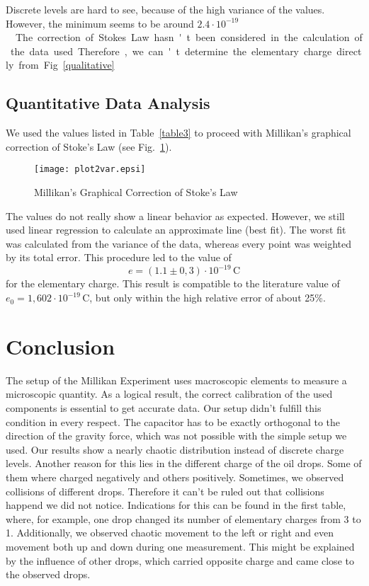 \documentclass[a4paper,10pt]{article}
\begin{document}
Discrete levels are hard to see, because of the high variance of the values. However, the minimum seems to be around \unit{$2.4\cdot10^{-19}$}{\coulomb}. The correction of Stokes Law hasn't been considered in the calculation of the data used. Therefore, we can't determine the elementary charge directly from Fig~\ref{qualitative}.
\clearpage
\subsection{Quantitative Data Analysis}
We used the values listed in Table~\ref{table3} to proceed with Millikan's graphical correction of Stoke's Law (see Fig.~\ref{correction}).
\begin{figure}[ht]
    \centering
    \texttt{[image: plot2var.epsi]}
    \caption{Millikan's Graphical Correction of Stoke's Law}
    \label{correction}
\end{figure}

The values do not really show a linear behavior as expected. However, we still used linear regression to calculate an approximate line (best fit). The worst fit was calculated from the variance of the data, whereas every point was weighted by its total error. This procedure led to the value of
\begin{equation}
e =(1.1 \pm 0,3)\cdot 10^{-19} \, \text{C}
\end{equation}
for the elementary charge. This result is compatible to the literature value of $e_0 = 1,602 \cdot 10^{-19} \, \text{C}$, but only within the high relative error of about 25\%.
\section{Conclusion}
The setup of the Millikan Experiment uses macroscopic elements to measure a microscopic quantity. As a logical result, the correct calibration of the used components is essential to get accurate data. Our setup didn't fulfill this condition in every respect. The capacitor has to be exactly orthogonal to the direction of the gravity force, which was not possible with the simple setup we used. Our results show a nearly chaotic distribution instead of discrete charge levels. Another reason for this lies in the different charge of the oil drops. Some of them where charged negatively and others positively. Sometimes, we observed collisions of different drops. Therefore it can't be ruled out that collisions happend we did not notice. Indications for this can be found in the first table, where, for example, one drop changed its number of elementary charges from 3 to 1. Additionally, we observed chaotic movement to the left or right and even movement both up and down during one measurement. This might be explained by the influence of other drops, which carried opposite charge and came close to the observed drops.
\end{document}
